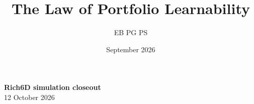 \documentclass[12pt,letterpaper]{article}
\title{
    \vspace{-1.5cm}
    {\LARGE\bfseries The Law of Portfolio Learnability}\\[0.35em]
    {\Large }
}
\author{
    EB
    \qquad
    PG
    \qquad
    PS
}
\date{September 2026}
\theoremstyle{definition}
\theoremstyle{remark}
\renewcommand{\thesection}{\Roman{section}}
\newcommand{\simoutput}{..}
\begin{document}
\begin{center}{\large\bfseries Rich6D simulation closeout}\\[0.15em]12 October 2026\end{center}

\clearpage\appendix
\renewcommand{\thesection}{\Alph{section}}

\end{document}
